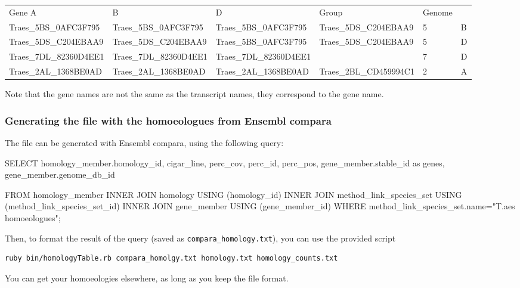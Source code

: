 \begin{tiny}
\begin{tabular}{llllll}
Gene A & B & D & Group & Genome \\
Traes\_5BS\_0AFC3F795 & Traes\_5BS\_0AFC3F795 & Traes\_5BS\_0AFC3F795 & Traes\_5DS\_C204EBAA9 & 5 & B \\
 Traes\_5DS\_C204EBAA9 & Traes\_5DS\_C204EBAA9 & Traes\_5BS\_0AFC3F795 & Traes\_5DS\_C204EBAA9& 5 & D \\
Traes\_7DL\_82360D4EE1 & Traes\_7DL\_82360D4EE1&Traes\_7DL\_82360D4EE1 & & 7 & D \\
Traes\_2AL\_1368BE0AD &  Traes\_2AL\_1368BE0AD & Traes\_2AL\_1368BE0AD & Traes\_2BL\_CD459994C1 & 2 & A \\ 
\end{tabular}
\end{tiny}

Note that the gene names are not the same as the transcript names, they
correspond to the gene name.

\subsubsection{Generating the file with the homoeologues from Ensembl
compara}\label{generating-the-file-with-the-homoeologues-from-ensembl-compara}

The file can be generated with Ensembl compara, using the following
query:

\begin{code}[language=SQL]
SELECT 
    homology_member.homology_id, cigar_line, perc_cov, perc_id, perc_pos, 
    gene_member.stable_id as genes, 
    gene_member.genome_db_id

FROM 
    homology_member 
INNER JOIN homology USING (homology_id) 
INNER JOIN method_link_species_set USING (method_link_species_set_id) 
INNER JOIN gene_member USING (gene_member_id)
WHERE method_link_species_set.name="T.aes homoeologues";
\end{code}

Then, to format the result of the query (saved as
\lstinline!compara_homology.txt!), you can use the provided script

\begin{lstlisting}[language=sh]
ruby bin/homologyTable.rb compara_homolgy.txt homology.txt homology_counts.txt
\end{lstlisting}

You can get your homoeologies elsewhere, as long as you keep the file
format.

